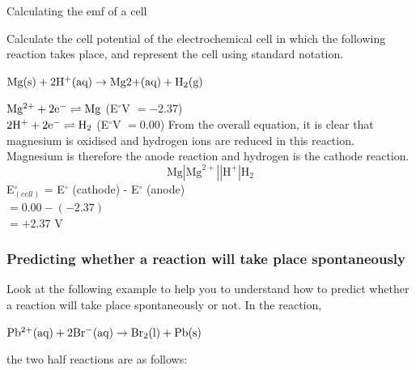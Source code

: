 \begin{wex}{Calculating the emf of a cell}{Calculate the cell potential of the electrochemical cell in which the following reaction takes place, and represent the cell using standard notation.
\begin{center}
$\rm{Mg(s) + 2H^{+}(aq) \rightarrow Mg{2+}(aq) + H_{2}(g)}$
\end{center}
}{
$\rm{Mg^{2+} + 2e^{-} \rightleftharpoons Mg}$ (E$^{\circ}$V $= -2.37$)\\
$\rm{2H^{+} + 2e^{-} \rightleftharpoons H_{2}}$ (E$^{\circ}$V $= 0.00$)
From the overall equation, it is clear that magnesium is oxidised and hydrogen ions are reduced in this reaction. Magnesium is therefore the anode reaction and hydrogen is the cathode reaction.
\begin{equation*}
\text{Mg}|\text{Mg}^{2+}||\text{H}^{+}|\text{H}_{2}
\end{equation*}
E$^{\circ}_{(cell)}$ = E$^{\circ}$ (cathode) - E$^{\circ}$ (anode)\\
$= 0.00 - (-2.37)$\\
$= +2.37$ V
}
\end{wex}

\subsubsection{Predicting whether a reaction will take place spontaneously}

Look at the following example to help you to understand how to predict whether a reaction will take place spontaneously or not.
In the reaction,

\begin{center}
$\rm{Pb^{2+}(aq) + 2Br^{-}(aq) \rightarrow Br_{2}(l) + Pb(s)}$
\end{center}

the two half reactions are as follows:

